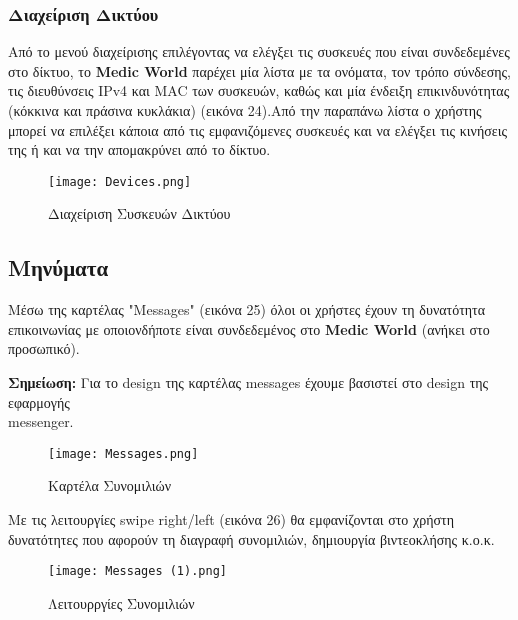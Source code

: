 \documentclass{article}
\begin{document}
\subsubsection{Διαχείριση Δικτύου}

Από το μενού διαχείρισης επιλέγοντας να ελέγξει τις συσκευές που είναι συνδεδεμένες στο δίκτυο, το \textbf{Medic World} παρέχει μία λίστα με τα ονόματα, τον τρόπο σύνδεσης, τις διευθύνσεις IPv4 και MAC των συσκευών, καθώς και μία ένδειξη επικινδυνότητας (κόκκινα και πράσινα κυκλάκια) (εικόνα 24).Από την παραπάνω λίστα ο χρήστης μπορεί  να επιλέξει κάποια από τις εμφανιζόμενες συσκευές και να ελέγξει τις κινήσεις της ή και να την απομακρύνει από το δίκτυο.


\begin{figure}[!htb]
\centering
\texttt{[image: Devices.png]} 
\caption{\label{fig: devices} Διαχείριση Συσκευών Δικτύου}
\end{figure}

\subsection{Μηνύματα}

Μέσω της καρτέλας "Messages" (εικόνα 25) όλοι οι χρήστες έχουν τη δυνατότητα επικοινωνίας με οποιονδήποτε είναι συνδεδεμένος στο \textbf{Medic World} (ανήκει στο προσωπικό). 

\vspace{0.3cm}

\textbf{Σημείωση:} Για το design της καρτέλας messages έχουμε βασιστεί στο design της εφαρμογής \\ messenger.

\vspace{0.3cm}

\begin{figure}[!htb]
\centering
\texttt{[image: Messages.png]} 
\caption{\label{fig: messenger} Καρτέλα Συνομιλιών}
\end{figure}

\newpage

\par Με τις λειτουργίες swipe right/left (εικόνα 26) θα εμφανίζονται στο χρήστη δυνατότητες  που αφορούν τη διαγραφή συνομιλιών, δημιουργία βιντεοκλήσης κ.ο.κ. 

\vspace{0.3cm}

\begin{figure}[!htb]
\centering
\texttt{[image: Messages (1).png]} 
\caption{\label{fig: swipe left/right} Λειτουρργίες Συνομιλιών}
\end{figure}
\end{document}

